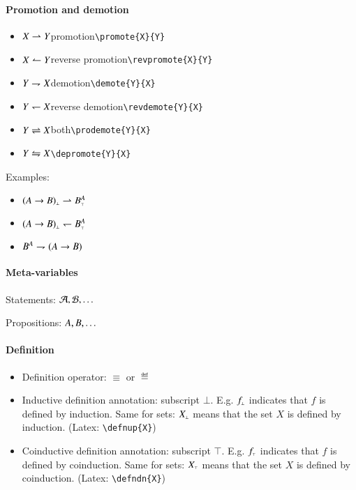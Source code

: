 \paragraph{Promotion and demotion}

\begin{itemize}
\item \(X\rightharpoonup{}Y\)\quad promotion\hfill \verb|\promote{X}{Y}|
\item \(X\leftharpoonup{}Y\)\quad reverse promotion\hfill \verb|\revpromote{X}{Y}|
\item \(Y\rightharpoondown{}X\)\quad demotion\hfill\verb|\demote{Y}{X}|
\item \(Y\leftharpoondown{}X\)\quad reverse demotion\hfill\verb|\revdemote{Y}{X}|
\item \(Y\rightleftharpoons{}X\)\quad both\hfill \verb|\prodemote{Y}{X}|
\item \(Y\leftrightharpoons{}X\)\hfill\verb|\depromote{Y}{X}|
\end{itemize}

Examples:

\begin{itemize}
\item \((A\rightarrow{}B)_{\scriptscriptstyle\bot}\rightharpoonup{}B_{\scriptscriptstyle\top}^{A}\)
\item \((A\rightarrow{}B)_{\scriptscriptstyle\bot}\leftharpoondown{}B_{\scriptscriptstyle\top}^{A}\)
\item \(B^{A}\rightharpoondown{}(A\rightarrow{}B)\)
\end{itemize}


\paragraph{Meta-variables}

Statements: \(\mathcal{A}, \mathcal{B}, \ldots\)

Propositions: \(A, B, \ldots\)


\paragraph{Definition}\label{notation:definition}

\begin{itemize}
\item Definition operator: \(\equiv\) or \(\eqdef\)
\item Inductive definition annotation: subscript
  \(\bot\). E.g. \(f_{\scriptscriptstyle\bot}\) indicates that
  \(f\) is defined by induction. Same for sets: \(X_{\scriptscriptstyle\bot}\) means
  that the set \(X\) is defined by induction. (Latex:
  \texttt{\textbackslash{}defnup\{X\}})
\item Coinductive definition annotation: subscript \(\top\). E.g.
  \(f_{\scriptscriptstyle\top}\) indicates that \(f\) is defined by coinduction. Same
  for sets: \(X_{\scriptscriptstyle\top}\) means that the set \(X\) is defined by
  coinduction. (Latex: \texttt{\textbackslash{}defndn\{X\}})
\end{itemize}


